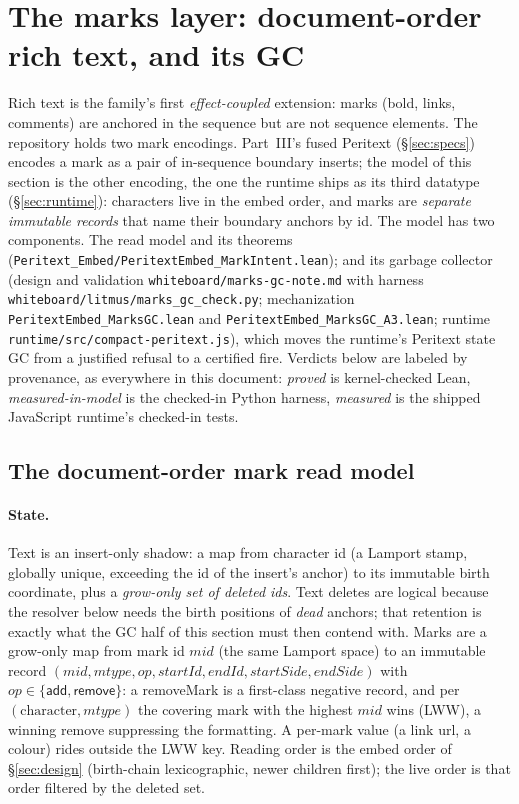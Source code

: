 \documentclass[11pt]{article}
\newcommand{\code}[1]{\texttt{#1}}
\begin{document}
\section{The marks layer: document-order rich text, and its GC}
\label{sec:marks}

Rich text is the family's first \emph{effect-coupled} extension: marks
(bold, links, comments) are anchored in the sequence but are not
sequence elements. The repository holds two mark encodings. Part~III's
fused Peritext (\S\ref{sec:specs}) encodes a mark as a pair of
in-sequence boundary inserts; the model of this section is the other
encoding, the one the runtime ships as its third datatype
(\S\ref{sec:runtime}): characters live in the embed order, and marks
are \emph{separate immutable records} that name their boundary anchors
by id. The model has two components. The read model and its theorems
(\code{Peritext\_Embed/PeritextEmbed\_MarkIntent.lean}); and its garbage
collector (design and validation \code{whiteboard/marks-gc-note.md} with
harness \code{whiteboard/litmus/marks\_gc\_check.py}; mechanization
\code{PeritextEmbed\_MarksGC.lean} and
\code{PeritextEmbed\_MarksGC\_A3.lean}; runtime
\code{runtime/src/compact-peritext.js}), which moves the runtime's
Peritext state GC from a justified refusal to a certified fire. Verdicts below
are labeled by provenance, as everywhere in this document:
\emph{proved} is kernel-checked Lean, \emph{measured-in-model} is the
checked-in Python harness, \emph{measured} is the shipped JavaScript
runtime's checked-in tests.

\subsection{The document-order mark read model}
\label{sec:markmodel}

\paragraph{State.} Text is an insert-only shadow: a map from character
id (a Lamport stamp, globally unique, exceeding the id of the insert's
anchor) to its immutable birth coordinate, plus a \emph{grow-only set
of deleted ids}. Text deletes are logical because the resolver below
needs the birth positions of \emph{dead} anchors; that retention is
exactly what the GC half of this section must then contend with. Marks
are a grow-only map from mark id $\mathit{mid}$ (the same Lamport
space) to an immutable record $(\mathit{mid}, \mathit{mtype},
\mathit{op}, \mathit{startId}, \mathit{endId}, \mathit{startSide},
\mathit{endSide})$ with $\mathit{op} \in \{\mathsf{add},
\mathsf{remove}\}$: a \textsf{removeMark} is a first-class negative
record, and per $(\text{character}, \mathit{mtype})$ the covering mark
with the highest $\mathit{mid}$ wins (LWW), a winning remove
suppressing the formatting. A per-mark value (a link url, a colour)
rides outside the LWW key. Reading order is the embed order of
\S\ref{sec:design} (birth-chain lexicographic, newer children first);
the live order is that order filtered by the deleted set.
\end{document}
